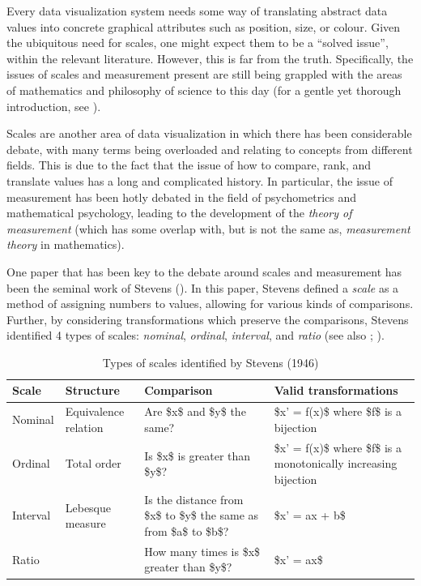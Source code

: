 \documentclass[
]{book}
\theoremstyle{definition}
\theoremstyle{definition}
\theoremstyle{definition}
\theoremstyle{definition}
\theoremstyle{remark}
\begin{document}
Every data visualization system needs some way of translating abstract data values into concrete graphical attributes such as position, size, or colour. Given the ubiquitous need for scales, one might expect them to be a ``solved issue'', within the relevant literature. However, this is far from the truth. Specifically, the issues of scales and measurement present are still being grappled with the areas of mathematics and philosophy of science to this day (for a gentle yet thorough introduction, see ).

Scales are another area of data visualization in which there has been considerable debate, with many terms being overloaded and relating to concepts from different fields. This is due to the fact that the issue of how to compare, rank, and translate values has a long and complicated history. In particular, the issue of measurement has been hotly debated in the field of psychometrics and mathematical psychology, leading to the development of the \emph{theory of measurement} (which has some overlap with, but is not the same as, \emph{measurement theory} in mathematics).

One paper that has been key to the debate around scales and measurement has been the seminal work of Stevens (). In this paper, Stevens defined a \emph{scale} as a method of assigning numbers to values, allowing for various kinds of comparisons. Further, by considering transformations which preserve the comparisons, Stevens identified 4 types of scales: \emph{nominal}, \emph{ordinal}, \emph{interval}, and \emph{ratio} (see also ; ).

\begin{table}

\caption{\label{tab:scales}Types of scales identified by Stevens (1946)}
\centering
\begin{tabular}[t]{l|l|l|l}
\hline
Scale & Structure & Comparison & Valid transformations\\
\hline
Nominal & Equivalence relation & Are \$x\$ and \$y\$ the same? & \$x' = f(x)\$ where \$f\$ is a bijection\\
\hline
Ordinal & Total order & Is \$x\$ is greater than \$y\$? & \$x' = f(x)\$ where \$f\$ is a monotonically increasing bijection\\
\hline
Interval & Lebesque measure & Is the distance from \$x\$ to \$y\$ the same as from \$a\$ to \$b\$? & \$x' = ax + b\$\\
\hline
Ratio &  & How many times is \$x\$ greater than \$y\$? & \$x' = ax\$\\
\hline
\end{tabular}
\end{table}
\end{document}
